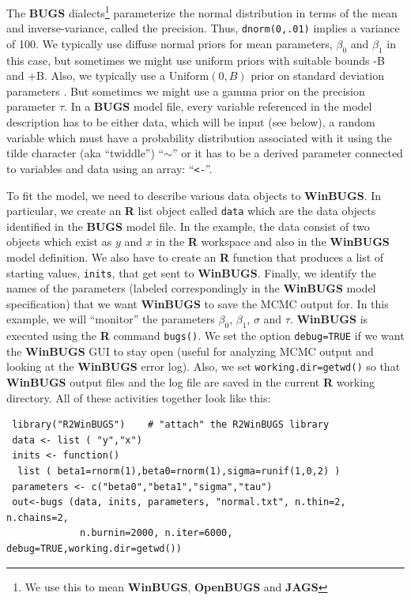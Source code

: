 The {\bf BUGS} dialects\footnote{We use this to mean {\bf WinBUGS}, {\bf OpenBUGS} and
  {\bf JAGS}}  parameterize the normal 
distribution in
terms of the mean and inverse-variance, called the precision. Thus,
\mbox{\tt dnorm(0,.01)} implies a variance of 100.
We typically use diffuse normal priors for mean parameters, $\beta_0$ and $\beta_1$ in this case, but sometimes we might use uniform priors with suitable bounds -B and +B.
Also, we typically use a $\text{Uniform}(0,B)$ prior on standard
deviation parameters
\citep{gelman:2006}.
But sometimes we might use a gamma prior on the precision parameter $\tau$.
In a {\bf BUGS} model file, every variable referenced in
the model description has to be
either data, which will be input (see below), a random variable which
must have a probability distribution associated with it using the
tilde character (aka ``twiddle'')  ``$\sim$''
 or it has to be a derived parameter connected to variables and
data using an array: ``\mbox{\tt <-}''.


To fit the model, we need to describe various data objects to {\bf
  WinBUGS}. In particular,
we create an {\bf R} list object called \mbox{\tt data} which
are the data objects identified in the {\bf BUGS} model file.
 In the example, the
data consist of two objects which exist as $y$ and $x$ in the {\bf R}
workspace and also in the {\bf WinBUGS} model definition.
 We also have to create an {\bf R} function
that produces a list of starting values, \mbox{\tt inits}, that get sent to
{\bf WinBUGS}.
 Finally, we identify
the names of the parameters (labeled correspondingly in the {\bf WinBUGS}
model specification) that we want {\bf WinBUGS} to save the MCMC output
for. In this example, we will ``monitor'' the parameters
$\beta_0$, $\beta_1$, $\sigma$ and $\tau$.
{\bf WinBUGS} is executed using the {\bf R} command
\mbox{\tt bugs()}.
We set the option \mbox{\tt debug=TRUE} if we want the {\bf WinBUGS}
GUI to stay open (useful for analyzing MCMC output and looking at the
{\bf WinBUGS} error log). Also, we set \mbox{\tt working.dir=getwd()}
so that {\bf WinBUGS} output files and the log file are saved in the
current {\bf R} working directory.
  All of these activities together look like this:
{\small
\begin{verbatim}
 library("R2WinBUGS")    # "attach" the R2WinBUGS library
 data <- list ( "y","x")
 inits <- function()
  list ( beta1=rnorm(1),beta0=rnorm(1),sigma=runif(1,0,2) )
 parameters <- c("beta0","beta1","sigma","tau")
 out<-bugs (data, inits, parameters, "normal.txt", n.thin=2, n.chains=2,
             n.burnin=2000, n.iter=6000, debug=TRUE,working.dir=getwd())
\end{verbatim}
}

